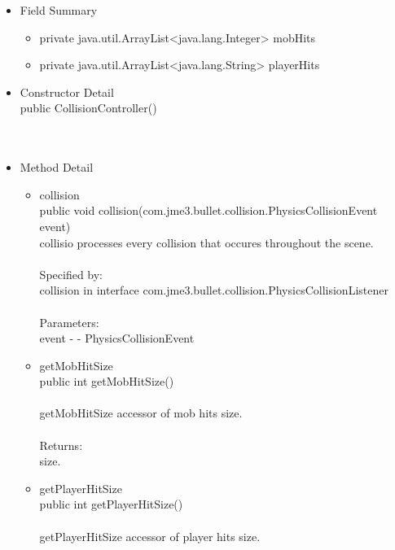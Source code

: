\documentclass[letterpaper]{article}
\begin{document}
								\begin{itemize}
									\item	Field Summary
											\begin{itemize}
												\item	private java.util.ArrayList<java.lang.Integer>	mobHits 
												\item	private java.util.ArrayList<java.lang.String>	playerHits 
											\end{itemize}
									\item	Constructor Detail \\
											public CollisionController() \\ \\ \\
									\item	Method Detail
											\begin{itemize}
												\item	collision \\
														public void collision(com.jme3.bullet.collision.PhysicsCollisionEvent event) \\
														collisio processes every collision that occures throughout the scene. \\ \\
														Specified by: \\
														collision in interface com.jme3.bullet.collision.PhysicsCollisionListener \\ \\
														Parameters: \\
														event - - PhysicsCollisionEvent \\
												\item	getMobHitSize \\
														public int getMobHitSize() \\ \\
														getMobHitSize accessor of mob hits size. \\ \\
														Returns: \\
														size. \\
												\item	getPlayerHitSize \\
														public int getPlayerHitSize() \\ \\
														getPlayerHitSize accessor of player hits size. \\ \\

\end{itemize}
\end{itemize}
\end{document}
